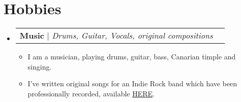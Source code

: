 \documentclass[letterpaper,11pt]{article}
\makeatletter
\newcommand{\resumeItem}[1]{
  \item\small{
    {#1 \vspace{-2pt}}
  }
}
\newcommand{\resumeProjectHeading}[2]{
    \item
    \begin{tabular*}{0.97\textwidth}{l@{\extracolsep{\fill}}r}
      \small#1 & #2 \\
    \end{tabular*}\vspace{-7pt}
}
\newcommand{\resumeSubHeadingListStart}{\begin{itemize}[leftmargin=0.15in, label={}]}
\newcommand{\resumeSubHeadingListEnd}{\end{itemize}}
\newcommand{\resumeItemListStart}{\begin{itemize}}
\newcommand{\resumeItemListEnd}{\end{itemize}\vspace{-5pt}}
\makeatother
\begin{document}
\section{Hobbies}
\resumeSubHeadingListStart
    \resumeProjectHeading
          {\textbf{Music} $|$ \emph{Drums, Guitar, Vocals, original compositions}}{}
          \resumeItemListStart
            \resumeItem{I am a musician, playing drums, guitar, bass, Canarian timple and singing.}
            \resumeItem{I've written original songs for an Indie Rock band which have been professionally recorded, available \href{https://open.spotify.com/artist/6vROqVU2bVHOp3V4q09ljN?si=0pgR7wFLS8CgVicZ_6a1GQ}{\underline{HERE}}.}
          \resumeItemListEnd
    \resumeSubHeadingListEnd

%
\end{document}
